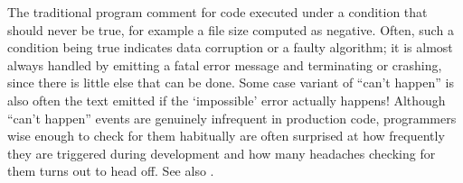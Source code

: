 
The traditional program comment for code executed under a condition that should
never be true, for example a file size computed as negative. Often, such a
condition being true indicates data corruption or a faulty algorithm; it is
almost always handled by emitting a fatal error message and terminating or
crashing, since there is little else that can be done. Some case variant of
``can't happen'' is also often the text emitted if the `impossible' error
actually happens! Although ``can't happen'' events are genuinely infrequent in
production code, programmers wise enough to check for them habitually are often
surprised at how frequently they are triggered during development and how many
headaches checking for them turns out to head off. See also .


